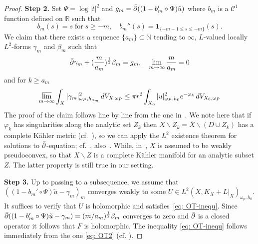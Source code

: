 \documentclass[a4paper, 11pt]{amsart}
\theoremstyle{plain}
\numberwithin{equation}{section} %
\numberwithin{figure}{section} %
\theoremstyle{plain}
\theoremstyle{plain}
\theoremstyle{plain}
\theoremstyle{plain}
\theoremstyle{remark}
\theoremstyle{definition}
\theoremstyle{definition}
\begin{document}
\begin{proof}
\smallskip
\textbf{Step 2.}   
Set $\Psi=\log|t|^2$ and $g_m=\Bar{\partial}((1-b_m'\circ\Psi)\Tilde u)$ where $b_m$ is a $\mathcal{C}^1$ function defined on $\mathbb{R}$ such that \[b_m(s)=s \;\text{for}\; s\geq -m,\quad b_m''(s)=\mathbf{1}_{\{-m-1\leq s\leq -m\}}(s).\]
We claim that there exists a sequence $\{a_m\}\subset\mathbb{N} $ tending to $\infty$, $L$-valued locally
$L^2$-forms $\gamma_m$ and $\beta_m$ such that
\[\Bar{\partial}\gamma_m+(\frac{m}{a_m})^{\frac{1}{2}}\beta_m=g_m,\quad\lim_{m\to\infty}\frac{m}{a_m}=0 \]
and for $k\geq a_m$
\begin{equation}\label{eq: OT2}
   \varlimsup _{m\to\infty} \int_{X}{|\gamma_m|^2_{\omega_{\rm P},h_{a_m}}}\, {\rm d}V_{X,\omega_{\rm P}}\leq \pi r^2\int_{X_0}|u|^2_{\omega_{\rm P},h_0}e^{-\varphi_{k}}\,{\rm d}V_{X_0,\omega_{\rm P}}
\end{equation}
The proof of the claim follows line by line from the one in~\cite[p. 25]{cao17-OTtheorem}.
We note here that if $\varphi_k$ has singularities along the analytic set $Z_k$ then $X\backslash Z_k=\overline{X}\backslash(D\cup Z_k)$ has a complete K\"ahler metric (cf.~\cite[Lemma 12.9]{Deamilly-book-analytic}), so we can apply the $L^2$ existence theorem for solutions to $\Bar{\partial}$-equation; cf.~\cite[Proposition 13.4, Remark 13.5]{Deamilly-book-analytic}, also~\cite[Appendix]{cao17-OTtheorem}. While, in~\cite{cao17-OTtheorem}, $X$ is assumed to be weakly pseudoconvex, so that $X\backslash Z$ is a complete K\"ahler manifold for an analytic subset $Z$. The latter property is still true in our setting. 

  \smallskip
  \textbf{Step 3.} Up to passing to a subsequence, we assume that $((1-b_m'\circ\Psi)\tilde u-\gamma_m)_m$ 
converges weakly to some $U\in L^2(X,K_X+L|_X)_{\omega_p,h_0}$. It suffices to verify that $U$ is holomorphic and satisfies~\eqref{eq: OT-inequ}. 
Since $\Bar{\partial}((1-b_m'\circ\Psi)\tilde u-\gamma_m)=(m/a_m)^{\frac{1}{2}}\beta_m$ converges to zero and $\Bar\partial$ is a closed operator it follows that $F$ is holomorphic. The inequality \eqref{eq: OT-inequ} follows immediately from the one \eqref{eq: OT2} (cf. \cite[page 26]{cao17-OTtheorem}).


\end{proof}
\end{document}

